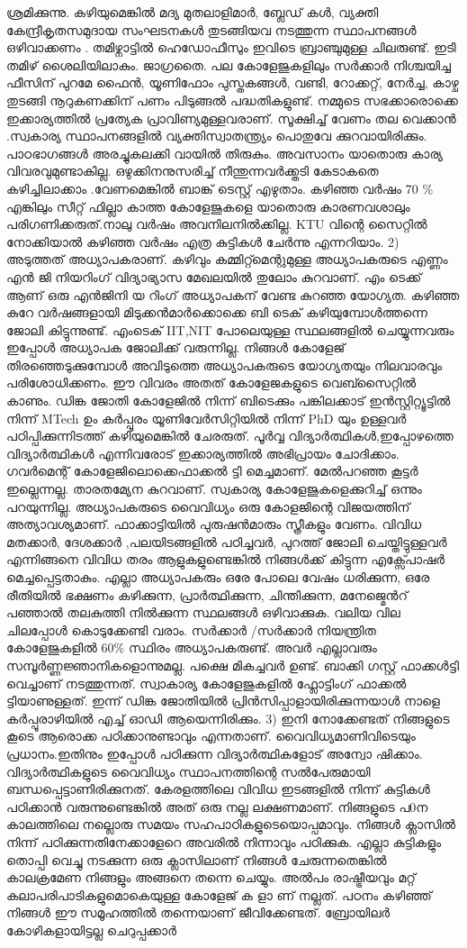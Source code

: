 \documentclass[10pt,a4paper]{report}
\begin{document}
ശ്രമിക്കുന്നു. കഴിയുമെങ്കിൽ മദ്യ മുതലാളിമാർ, ബ്ലേഡ് കൾ, വ്യക്തി കേന്ദ്രീകൃതസമുദായ സംഘടനകൾ തുടങ്ങിയവ നടത്തുന്ന സ്ഥാപനങ്ങൾ ഒഴിവാക്കണം . തമിഴ്നാട്ടിൽ ഹെഡോഫീസും ഇവിടെ ബ്രാഞ്ചുമുള്ള ചിലരുണ്ട്. ഇടി തമിഴ് ശൈലിയിലാകും. ജാഗ്രതൈ. പല കോളേജുകളിലും സർക്കാർ നിശ്ചയിച്ച ഫീസിന് പുറമേ ഫൈൻ, യൂണിഫോം പുസ്തകങ്ങൾ, വണ്ടി, റോക്കറ്റ്, നേർച്ച, കാഴ്ച തുടങ്ങി നൂറുകണക്കിന് പണം പിടുങ്ങൽ പദ്ധതികളുണ്ട്. നമ്മുടെ സഭക്കാരൊക്കെ ഇക്കാര്യത്തിൽ പ്രത്യേക പ്രാവിണ്യമുള്ളവരാണ്. സൂക്ഷിച്ച് വേണം തല വെക്കാൻ .സ്വകാര്യ സ്ഥാപനങ്ങളിൽ വ്യക്തിസ്വാതന്ത്ര്യം പൊതുവേ ക്കുറവായിരിക്കും. പാഠഭാഗങ്ങൾ അരച്ചുകലക്കി വായിൽ തിരുകും. അവസാനം യാതൊരു കാര്യ വിവരവുമുണ്ടാകില്ല. ഒഴുക്കിനനുസരിച്ച് നീന്തുന്നവർക്ക്തടി കേടാകതെ കഴിച്ചിലാക്കാം .വേണമെങ്കിൽ ബാങ്ക് ടെസ്റ്റ് എഴുതാം. കഴിഞ്ഞ വർഷം 70 \% എങ്കിലും സീറ്റ് ഫില്ലാ കാത്ത കോളേജുകളെ യാതൊരു കാരണവശാലും പരിഗണിക്കരുത്.നാലു വർഷം അവനിലനിൽക്കില്ല. KTU വിന്റെ സൈറ്റിൽ നോക്കിയാൽ കഴിഞ്ഞ വർഷം എത്ര കുട്ടികൾ ചേർന്നു എന്നറിയാം. 2) അടുത്തത് അധ്യാപകരാണ്. കഴിവും കമ്മിറ്റ്മെന്റുമുള്ള അധ്യാപകരുടെ എണ്ണം എൻ ജി നിയറിംഗ് വിദ്യാഭ്യാസ മേഖലയിൽ തുലോം കുറവാണ്. എം ടെക്ക് ആണ് ഒരു എൻജിനി യ റിംഗ് അധ്യാപകന് വേണ്ട കുറഞ്ഞ യോഗ്യത. കഴിഞ്ഞ കുറേ വർഷങ്ങളായി മിടുക്കൻമാർക്കൊക്കെ ബി ടെക്‌ കഴിയുമ്പോൾത്തന്നെ ജോലി കിട്ടുന്നുണ്ട്. എംടെക് IIT,NIT പോലെയുള്ള സ്ഥലങ്ങളിൽ ചെയ്യുന്നവരും ഇപ്പോൾ അധ്യാപക ജോലിക്ക് വരുന്നില്ല. നിങ്ങൾ കോളേജ് തിരഞ്ഞെടുക്കുമ്പോൾ അവിടുത്തെ അധ്യാപകരുടെ യോഗ്യതയും നിലവാരവും പരിശോധിക്കണം. ഈ വിവരം അതത് കോളേജകളുടെ വെബ്സൈറ്റിൽ കാണും. ഡിങ്ക ജോതി കോളേജിൽ നിന്ന് ബിടെക്കും പങ്കിലക്കാട് ഇൻസ്റ്റിറ്റ്യൂട്ടിൽ നിന്ന് MTech ഉം കർപ്പൂരം യൂണിവേർസിറ്റിയിൽ നിന്ന് PhD യും ഉള്ളവർ പഠിപ്പിക്കുന്നിടത്ത് കഴിയുമെങ്കിൽ ചേരരുത്. പൂർവ്വ വിദ്യാർത്ഥികൾ,ഇപ്പോഴത്തെ വിദ്യാർത്ഥികൾ എന്നിവരോട് ഇക്കാര്യത്തിൽ അഭിപ്രായം ചോദിക്കാം. ഗവർമെന്റ് കോളേജിലൊക്കെഫാക്കൽ ട്ടി മെച്ചമാണ്. മേൽപറഞ്ഞ കൂട്ടർ ഇല്ലെന്നല്ല. താരതമ്യേന കുറവാണ്. സ്വകാര്യ കോളേജുകളെക്കുറിച്ച് ഒന്നും പറയുന്നില്ല. അധ്യാപകരുടെ വൈവിധ്യം ഒരു കോളജിന്റെ വിജയത്തിന് അത്യാവശ്യമാണ്. ഫാക്കാട്ടിയിൽ പുരുഷൻമാരും സ്ത്രീകളും വേണം. വിവിധ മതക്കാർ, ദേശക്കാർ ,പലയിടങ്ങളിൽ പഠിച്ചവർ, പുറത്ത് ജോലി ചെയ്തിട്ടുള്ളവർ എന്നിങ്ങനെ വിവിധ തരം ആളുകളുണ്ടെങ്കിൽ നിങ്ങൾക്ക് കിട്ടുന്ന എക്സ്പോഷർ മെച്ചപ്പെട്ടതാകും. എല്ലാ അധ്യാപകരും ഒരേ പോലെ വേഷം ധരിക്കുന്ന, ഒരേ രീതിയിൽ ഭക്ഷണം കഴിക്കുന്ന, പ്രാർത്ഥിക്കുന്ന, ചിന്തിക്കുന്ന, മനേജ്മെൻറ് പഞ്ഞാൽ തലകുത്തി നിൽക്കുന്ന സ്ഥലങ്ങൾ ഒഴിവാക്കുക. വലിയ വില ചിലപ്പോൾ കൊടുക്കേണ്ടി വരാം. സർക്കാർ /സർക്കാർ നിയന്ത്രിത കോളേജുകളിൽ 60\% സ്ഥിരം അധ്യാപകരുണ്ട്. അവർ എല്ലാവരും സമ്പൂർണ്ണജ്ഞാനികളൊന്നുമല്ല. പക്ഷെ മികച്ചവർ ഉണ്ട്. ബാക്കി ഗസ്റ്റ് ഫാക്കൾട്ടി വെച്ചാണ് നടത്തുന്നത്. സ്വാകാര്യ കോളേജുകളിൽ ഫ്ലോട്ടിംഗ് ഫാക്കൽ ട്ടിയാണുള്ളത്. ഇന്ന് ഡിങ്ക ജോതിയിൽ പ്രിൻസിപ്പാളായിരിക്കുന്നയാൾ നാളെ കർപ്പൂരാഴിയിൽ എച്ച് ഓഡി ആയെന്നിരിക്കും. 3) ഇനി നോക്കേണ്ടത് നിങ്ങളുടെ കൂടെ ആരൊക്ക പഠിക്കാനുണ്ടാവും എന്നതാണ്. വൈവിധ്യമാണിവിടെയും പ്രധാനം.ഇതിനും ഇപ്പോൾ പഠിക്കുന്ന വിദ്യാർത്ഥികളോട് അന്വോ ഷിക്കാം. വിദ്യാർത്ഥികളുടെ വൈവിധ്യം സ്ഥാപനത്തിന്റെ സൽപേരുമായി ബന്ധപ്പെട്ടാണിരിക്കുനത്. കേരളത്തിലെ വിവിധ ഇടങ്ങളിൽ നിന്ന് കുട്ടികൾ പഠിക്കാൻ വരുന്നുണ്ടെങ്കിൽ അത് ഒരു നല്ല ലക്ഷണമാണ്. നിങ്ങളുടെ പ0ന കാലത്തിലെ നല്ലൊരു സമയം സഹപാഠികളുടെയൊപ്പമാവും. നിങ്ങൾ ക്ലാസിൽ നിന്ന് പഠിക്കുന്നതിനേക്കാളേറെ അവരിൽ നിന്നാവും പഠിക്കുക. എല്ലാ കുട്ടികളും തൊപ്പി വെച്ചു നടക്കുന്ന ഒരു ക്ലാസിലാണ് നിങ്ങൾ ചേരുന്നതെങ്കിൽ കാലക്രമേണ നിങ്ങളും അങ്ങനെ തന്നെ ചെയ്യും. അൽപം രാഷ്ട്രീയവും മറ്റ് കലാപരിപാടികളുമൊകെയുള്ള കോളേജ് ക ളാ ണ് നല്ലത്. പഠനം കഴിഞ്ഞ് നിങ്ങൾ ഈ സമൂഹത്തിൽ തന്നെയാണ് ജീവിക്കേണ്ടത്. ബ്രോയിലർ കോഴികളായിട്ടല്ല ചെറുപ്പക്കാർ 
\end{document}

